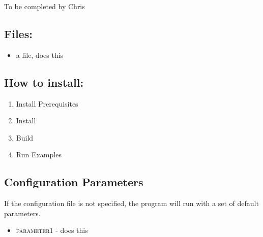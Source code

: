 To be completed by Chris

\subsection{Files:}

\begin{itemize}
\item{a file, does this}
\end{itemize}


\subsection{How to install:}
\begin{enumerate}
	\item{Install Prerequisites} 
	\item{Install } 
	\item{Build } 
	\item{Run Examples} 
\end{enumerate}

\subsection{Configuration Parameters}
If the configuration file is not specified, the program will run with a set of default parameters.
\begin{itemize}
	\item{\textsc{parameter1 }} - does this

\end{itemize}



